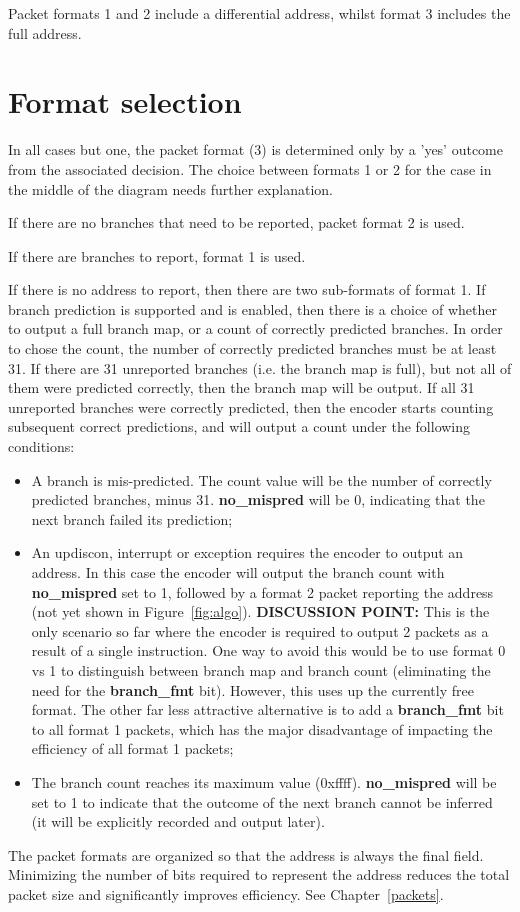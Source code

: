 Packet formats 1 and 2 include a differential address, whilst format 3 includes the full address.

\section{Format selection} \label{format-selection}

In all cases but one, the packet format (3) is determined only by a 'yes' outcome from the 
associated decision.  The choice between formats 1 or 2 for the case in the middle of the 
diagram needs further explanation.  

If there are no branches that need to be reported, packet format 2 is used.  

If there are branches to report, format 1 is used.

If there is no address to report, then there are two sub-formats of format 1.  If branch prediction
is supported and is enabled, then there is a choice of whether to output a full branch map, or a 
count of correctly predicted branches.  In order to chose the count, the number of correctly
predicted branches must be at least 31.  If there are 31 unreported branches (i.e. the branch
map is full), but not all of them were predicted correctly, then the branch map will be output.
If all 31 unreported branches were correctly predicted, then the encoder starts counting
subsequent correct predictions, and will output a count under the following conditions:

\begin{itemize}
  \item A branch is mis-predicted.  The count value will be the number of correctly predicted branches, 
    minus 31.  \textbf{no\_mispred} will be 0, indicating that the next branch failed its prediction;
  \item An updiscon, interrupt or exception requires the encoder to output an address.  In this case 
    the encoder will output the branch count with \textbf{no\_mispred} set to 1, followed by a format 2
    packet reporting the address (not yet shown in Figure~\ref{fig:algo}). 
    \textbf{DISCUSSION POINT:} This is the only scenario so far where the encoder is required to 
    output 2 packets as a result of a single instruction.  One way to avoid this would
    be to use format 0 vs 1 to distinguish between branch map and branch count (eliminating the need for
    the \textbf{branch\_fmt} bit).  However, this uses up the currently free format.  The other far less
    attractive alternative is to add a \textbf{branch\_fmt} bit to all format 1 packets, which has the 
    major disadvantage of impacting the efficiency of all format 1 packets;
  \item The branch count reaches its maximum value (0xffff).  \textbf{no\_mispred} will be set to 1 to
    indicate that the outcome of the next branch cannot be inferred (it will be explicitly recorded and
    output later).   
\end{itemize}

The packet formats are organized so that the address is always the final field.  Minimizing the 
number of bits required to represent the address reduces the total packet size and significantly
improves efficiency.  See Chapter~\ref{packets}.
